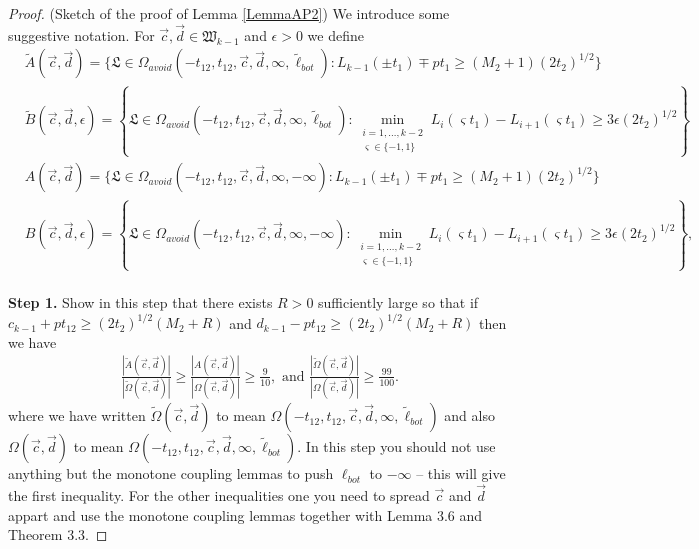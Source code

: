\begin{proof}(Sketch of the proof of Lemma \ref{LemmaAP2}) We introduce some suggestive notation. For $\vec{c}, \vec{d} \in \mathfrak{W}_{k-1}$ and $\epsilon > 0$ we define
	\begin{equation}
	\begin{split}
	&\tilde A(\vec{c}, \vec{d}) = \{\mathfrak{L} \in \Omega_{avoid}(-t_{12}, t_{12}, \vec{c}, \vec{d}, \infty, \tilde{\ell}_{bot}): L_{k-1}(\pm t_{1}) \mp pt_1 \geq (M_2 + 1) (2t_2)^{1/2} \} \\
	&\tilde B(\vec{c}, \vec{d}, \epsilon) = \left\{ \mathfrak{L} \in \Omega_{avoid}(-t_{12}, t_{12}, \vec{c}, \vec{d}, \infty, \tilde{\ell}_{bot}): \min_{\substack {i = 1, \dots, k-2 \\ \varsigma \in \{-1, 1\}} } L_{i}(\varsigma t_1) - L_{i+1}(\varsigma t_1) \geq 3\epsilon (2t_2)^{1/2} \right\} \\
	&A(\vec{c}, \vec{d}) = \{ \mathfrak{L} \in \Omega_{avoid}(-t_{12}, t_{12}, \vec{c}, \vec{d}, \infty, -\infty): L_{k-1}(\pm t_{1}) \mp pt_1 \geq (M_2 + 1) (2t_2)^{1/2} \} \\
	&B(\vec{c}, \vec{d}, \epsilon) = \left\{ \mathfrak{L} \in \Omega_{avoid}(-t_{12}, t_{12}, \vec{c}, \vec{d}, \infty, -\infty): \min_{\substack {i = 1, \dots, k-2 \\ \varsigma \in \{-1, 1\}} } L_{i}(\varsigma t_1) - L_{i+1}(\varsigma t_1) \geq 3\epsilon (2t_2)^{1/2} \right\}, \\
	\end{split}
	\end{equation} 
	
	{\bf \raggedleft Step 1.} Show in this step that there exists $R > 0$ sufficiently large so that if $c_{k-1} + pt_{12} \geq (2t_2)^{1/2} (M_2 + R)$ and $d_{k-1} - pt_{12} \geq (2t_2)^{1/2} (M_2 + R)$ then we have 
	\begin{equation}
	\begin{split}
	\frac{|\tilde A(\vec{c}, \vec{d})|}{|\tilde{\Omega}(\vec{c}, \vec{d})|} \geq \frac{| A(\vec{c}, \vec{d})|}{|{\Omega}(\vec{c}, \vec{d})|} \geq  \frac{9}{10}, \mbox{ and }\frac{|\tilde{\Omega}(\vec{c}, \vec{d})|}{|{\Omega}(\vec{c}, \vec{d})|} \geq \frac{99}{100}.
	\end{split}
	\end{equation} 
	where we have written $\tilde{\Omega}(\vec{c}, \vec{d})$ to mean ${\Omega}(-t_{12}, t_{12}, \vec{c}, \vec{d}, \infty, \tilde{\ell}_{bot})$ and also $\Omega(\vec{c}, \vec{d})$ to mean ${\Omega}(-t_{12}, t_{12}, \vec{c}, \vec{d}, \infty, \tilde{\ell}_{bot})$. In this step you should not use anything but the monotone coupling lemmas to push $\ell_{bot}$ to $-\infty$ -- this will give the first inequality. For the other inequalities one you need to spread $\vec{c}$ and $\vec{d}$ appart and use the monotone coupling lemmas together with Lemma 3.6 and Theorem 3.3.
	

\end{proof}
